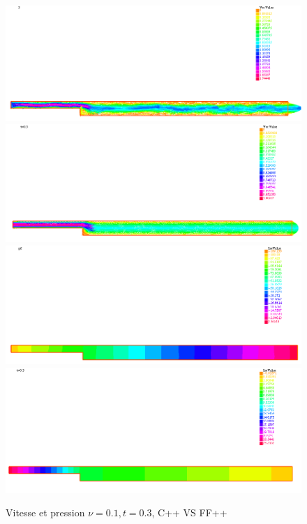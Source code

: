 \documentclass[a4paper,12pt]{article}
\begin{document}
\begin{figure}[!h]
	\caption{Vitesse et pression $\nu = 0.1,t=0.3$, C++ VS FF++}
	\centering
	\includegraphics[width=0.49\linewidth]{image/c++_NS_nu=01_t=3_u.png}
	\includegraphics[width=0.49\linewidth]{image/ff++_NS_nu=01_t=3_u.png}
	\includegraphics[width=0.49\linewidth]{image/c++_NS_nu=01_t=3_p.png}
	\includegraphics[width=0.49\linewidth]{image/ff++_NS_nu=01_t=3_p.png}
\end{figure}
\end{document}
